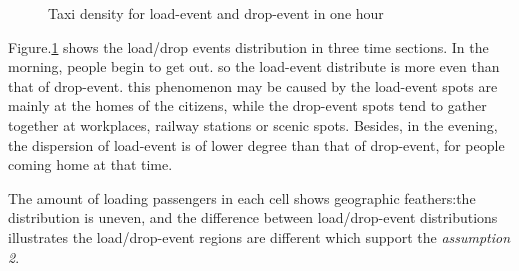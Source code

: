 \begin{figure}
\caption[c]{Taxi density for load-event and drop-event in one hour}\label{figure_taxi_density_for_one_hour}
\end{figure}

Figure.\ref{figure_taxi_density_for_one_hour} shows the load/drop events distribution in three time sections. In the morning, people begin to get out. so the load-event distribute is more even than that of drop-event. this phenomenon may be caused by the load-event spots are mainly at the homes of the citizens, while the drop-event spots tend to gather together at workplaces, railway stations or scenic spots. Besides, in the evening, the dispersion of load-event is of lower degree than that of drop-event, for people coming home at that time.

The amount of loading passengers in each cell shows geographic feathers:the distribution is uneven, and the difference between load/drop-event distributions illustrates the load/drop-event regions are different which support the \emph{assumption 2}.
